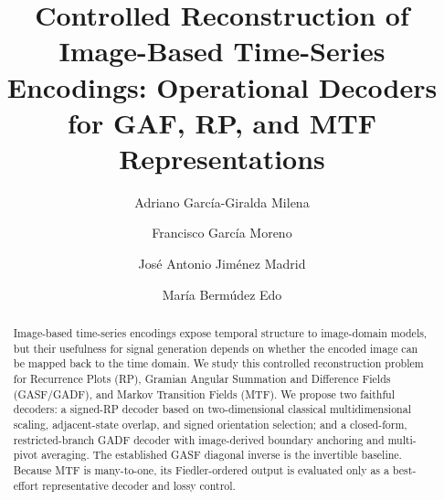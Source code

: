 \documentclass[5p]{elsarticle}
\begin{document}
\begin{frontmatter}

\title{Controlled Reconstruction of Image-Based Time-Series Encodings: Operational Decoders for GAF, RP, and MTF Representations}

\author[mydass]{Adriano García-Giralda Milena}
\author[cls]{Francisco García Moreno}
\author[alg]{José Antonio Jiménez Madrid}
\author[cls]{María Bermúdez Edo}








\begin{abstract}
Image-based time-series encodings expose temporal structure to image-domain models, but their usefulness for signal generation depends on whether the encoded image can be mapped back to the time domain. We study this controlled reconstruction problem for Recurrence Plots (RP), Gramian Angular Summation and Difference Fields (GASF/GADF), and Markov Transition Fields (MTF). We propose two faithful decoders: a signed-RP decoder based on two-dimensional classical multidimensional scaling, adjacent-state overlap, and signed orientation selection; and a closed-form, restricted-branch GADF decoder with image-derived boundary anchoring and multi-pivot averaging. The established GASF diagonal inverse is the invertible baseline. Because MTF is many-to-one, its Fiedler-ordered output is evaluated only as a best-effort representative decoder and lossy control.


\end{abstract}
\end{frontmatter}
\end{document}
